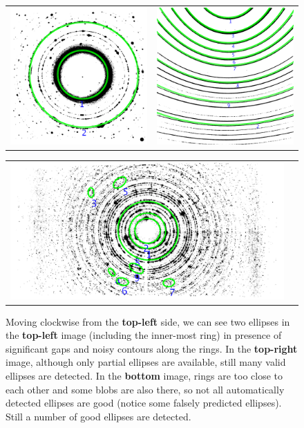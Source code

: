 \documentclass[preprint]{iucr}              %
\begin{document}
\begin{figure}
\begin{tabular}{cc}

\includegraphics[width=.45\linewidth,height=.45\textheight,keepaspectratio]{Ranked/o_Si12_0002__Ranked.png}&
\includegraphics[width=.45\linewidth,height=.45\textheight,keepaspectratio]{Ranked/o_tilted_002__Ranked.png}
\end{tabular}

\begin{tabular}{cc}
\includegraphics[width=.95\linewidth,keepaspectratio]{Ranked/o_LaB6_0021__Ranked.png}
\end{tabular}

\label{fig:result1}
\caption {Moving clockwise from the \textbf{top-left} side, we can see two
ellipses in the \textbf{top-left} image (including the inner-most ring) in
presence of significant gaps and noisy contours along the rings. 
In the \textbf{top-right} image, although only partial ellipses are available,
still many valid ellipses are detected. 
In the \textbf{bottom} image, rings are too
close to each other and some blobs are also there, so not all automatically
detected ellipses are good (notice some falsely predicted ellipses).      
Still a number of good ellipses are detected.}
\end{figure}
\end{document}
